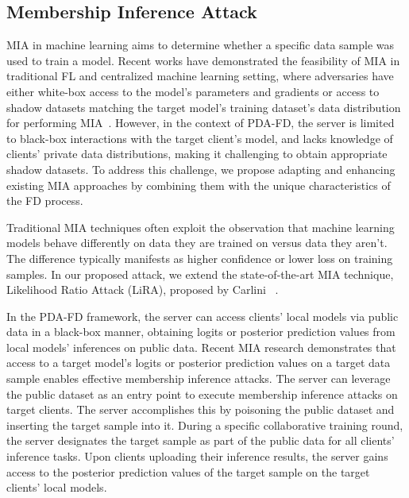 \subsection{Membership Inference Attack}

MIA in machine learning aims to determine whether a specific data sample was used to train a model.
Recent works have demonstrated the feasibility of MIA in traditional FL and centralized machine learning setting, where adversaries have either white-box access to the model's parameters and gradients or access to shadow datasets matching the target model's training dataset's data distribution for performing MIA~\cite{carlini2022membership, watson2021importance, shokri2017membership}.
However, in the context of PDA-FD, the server is limited to black-box interactions with the target client's model, and lacks knowledge of clients' private data distributions, making it challenging to obtain appropriate shadow datasets.
To address this challenge, we propose adapting and enhancing existing MIA approaches by combining them with the unique characteristics of the FD process.

Traditional MIA techniques often exploit the observation that machine learning models behave differently on data they are trained on versus data they aren't.
The difference typically manifests as higher confidence or lower loss on training samples.
In our proposed attack, we extend the state-of-the-art MIA technique, Likelihood Ratio Attack (LiRA), proposed by Carlini \etal~\cite{carlini2022membership}.


\iffalse
In the PDA-FD framework, the server can access clients' local models via public data in a black-box manner, obtaining logits or posterior prediction values from local models' inferences on public data.
Recent MIA research \cite{carlini2022membership, watson2021importance, shokri2017membership} demonstrates that access to a target model's logits or posterior prediction values on a target data sample enables effective membership inference attacks.
The server can leverage the public dataset as an entry point to execute membership inference attacks on target clients. The server accomplishes this by poisoning the public dataset and inserting the target sample into it.
During a specific collaborative training round, the server designates the target sample as part of the public data for all clients' inference tasks. 
Upon clients uploading their inference results, the server gains access to the posterior prediction values of the target sample on the target clients' local models.

